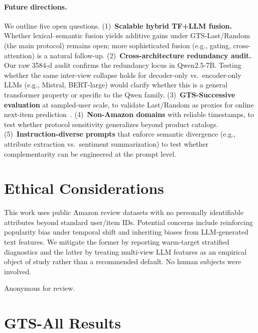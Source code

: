 \documentclass[sigconf,natbib=true,anonymous]{acmart}
\begin{document}
\paragraph{Future directions.}
We outline five open questions.
(1)~\textbf{Scalable hybrid TF+LLM fusion.}  Whether lexical--semantic fusion yields additive gains under GTS-Last/Random (the main protocol) remains open; more sophisticated fusion (e.g., gating, cross-attention) is a natural follow-up.
(2)~\textbf{Cross-architecture redundancy audit.}  Our raw 3584-d audit confirms the redundancy locus in Qwen2.5-7B.  Testing whether the same inter-view collapse holds for decoder-only vs.\ encoder-only LLMs (e.g., Mistral, BERT-large) would clarify whether this is a general transformer property or specific to the Qwen family.
(3)~\textbf{GTS-Successive evaluation} at sampled-user scale, to validate Last/Random as proxies for online next-item prediction~\cite{gusak2025time}.
(4)~\textbf{Non-Amazon domains} with reliable timestamps, to test whether protocol sensitivity generalizes beyond product catalogs.
(5)~\textbf{Instruction-diverse prompts} that enforce semantic divergence (e.g., attribute extraction vs.\ sentiment summarization) to test whether complementarity can be engineered at the prompt level.

\section*{Ethical Considerations}
This work uses public Amazon review datasets with no personally identifiable attributes beyond standard user/item IDs.
Potential concerns include reinforcing popularity bias under temporal shift and inheriting biases from LLM-generated text features.
We mitigate the former by reporting warm-target stratified diagnostics and the latter by treating multi-view LLM features as an empirical object of study rather than a recommended default.
No human subjects were involved.

\begin{acks}
Anonymous for review.
\end{acks}

\appendix

\section{GTS-All Results}
\label{app:gts-all}
\end{document}
